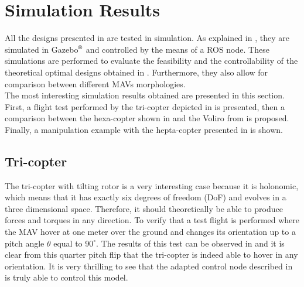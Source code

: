 \chapter{Simulation Results}
\label{sec:simulation_results}

All the designs presented in  are tested in simulation.
As explained in , they are simulated in
Gazebo$^\textrm{\textregistered}$ and controlled by the means of a ROS node.
These simulations are performed to evaluate the feasibility and  the controllability
of the theoretical optimal designs obtained in .
Furthermore, they also allow for comparison between different MAVs morphologies.\\
The most interesting simulation results obtained are presented in this section.
First, a flight test performed by the tri-copter depicted in  is
presented, then a comparison between the hexa-copter shown in 
and the Voliro from \citep{kamel_voliro:_2018} is proposed. Finally, a manipulation
example with the hepta-copter presented in  is shown.

\section{Tri-copter}
\label{sec:tri_copter_sim}

The tri-copter with tilting rotor is a very interesting case because it is holonomic,
which means that it has exactly six degrees of freedom (DoF) and evolves in a
three dimensional space. Therefore, it should theoretically be able to produce forces
and torques in any direction. To verify that a test flight is performed where the MAV
hover at one meter over the ground and changes its orientation up to a pitch angle
$\theta$ equal to $90^{\circ}$. The results of this test can be observed in
 and it is clear from this quarter pitch flip that the tri-copter
is indeed able to hover in any orientation. It is very thrilling to see that the adapted
control node described in  is truly able to control this
model.

